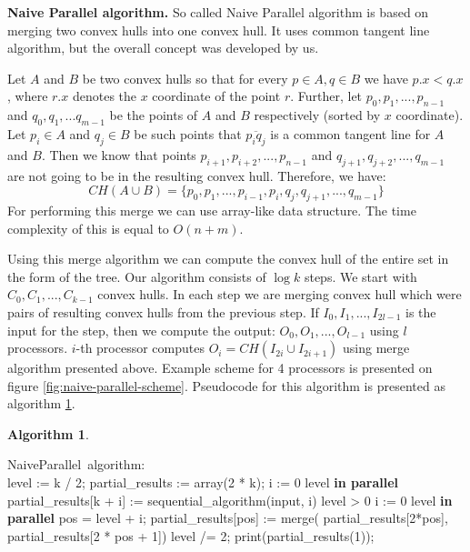 \documentclass[letterpaper]{article}
\newcommand{\mypar}[1]{{\bf #1.}}
\theoremstyle{definition}
\newtheorem{algorithm}{Algorithm}
\begin{document}
\mypar{Naive Parallel algorithm}
So called Naive Parallel algorithm is based on merging two convex hulls into one convex hull.
It uses common tangent line algorithm, but the overall concept was developed by us.

Let $A$ and $B$ be two convex hulls so that for every $p \in A, q \in B$ we have $p.x < q.x$, where $r.x$ denotes the $x$ coordinate of the point $r$.
Further, let $p_0, p_1, ..., p_{n-1}$ and $q_0, q_1, ... q_{m-1}$ be the points of $A$ and $B$ respectively (sorted by $x$ coordinate).
Let $p_i \in A$ and $q_j \in B$ be such points that $\overline{p_iq_j}$ is a common tangent line for $A$ and $B$.
Then we know that points $p_{i+1}, p_{i + 2}, ..., p_{n - 1}$ and $q_{j + 1}, q_{j + 2}, ..., q_{m - 1}$ are not going to be in the resulting convex hull.
Therefore, we have:
$$CH(A \cup B) = \{ p_0, p_1, ..., p_{i - 1}, p_i, q_j, q_{j + 1}, ..., q_{m - 1} \}$$
For performing this merge we can use array-like data structure.
The time complexity of this is equal to $O(n + m)$.

Using this merge algorithm we can compute the convex hull of the entire set in the form of the tree.
Our algorithm consists of $\log k$ steps.
We start with $C_0, C_1, ..., C_{k-1}$ convex hulls.
In each step we are merging convex hull which were pairs of resulting convex hulls from the previous step. 
If $I_0, I_1, ..., I_{2l - 1}$ is the input for the step, then we compute the output: $O_0, O_1, ..., O_{l - 1}$ using $l$ processors. 
$i$-th processor computes $O_i = CH(I_{2i} \cup I_{2i+1})$ using merge algorithm presented above.
Example scheme for 4 processors is presented on figure \ref{fig:naive-parallel-scheme}.
Pseudocode for this algorithm is presented as algorithm \ref{alg:naive-parallel}.

\begin{algorithm}
\label{alg:naive-parallel}
\begin{program}
\mbox{NaiveParallel algorithm:}
\BEGIN \\ %
  level := k / 2;
  partial\_results := array(2 * k);
  \FOR i := 0 \TO level  \textrm{\bf{\;in parallel}} \DO
    partial\_results[k + i] := 
    \;\;\;\; sequential\_algorithm(input, i)
  \OD
  \WHILE level > 0 \DO
    \FOR i := 0 \TO level  \textrm{\bf{\;in parallel}} \DO
      pos = level + i;
      partial\_results[pos] := merge(
      \;\;\;\; partial\_results[2*pos],
      \;\;\;\; partial\_results[2 * pos + 1])
    \OD
    level /= 2;
  \OD
  print(partial\_results(1));

\END
\end{program}
\end{algorithm}
\end{document}

